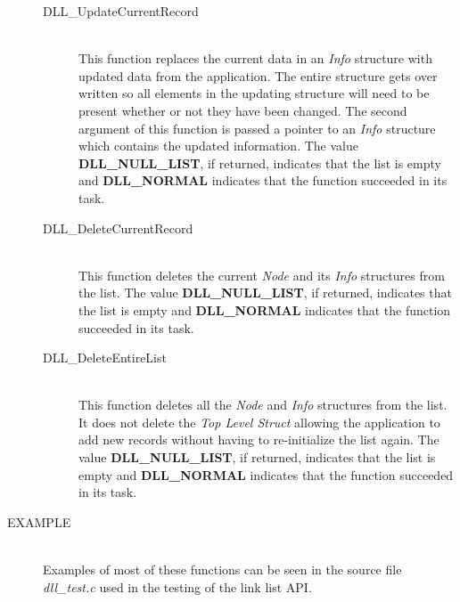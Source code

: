 \documentclass[10pt,letterpaper,titlepage]{article}
\begin{document}
\begin{description}
\begin{description}
 \item[DLL\_UpdateCurrentRecord]\quad\\
 This function replaces the current data in an \emph{Info} structure with updated data from the application.  The entire structure gets over written so all elements in the updating structure will need to be present whether or not they have been changed.  The second argument of this function is passed a pointer to an \emph{Info} structure which contains the updated information.  The value \textbf{DLL\_NULL\_LIST}, if returned, indicates that the list is empty and \textbf{DLL\_NORMAL} indicates that the function succeeded in its task.

 \item[DLL\_DeleteCurrentRecord]\quad\\
 This function deletes the current \emph{Node} and its \emph{Info} structures from the list.  The value \textbf{DLL\_NULL\_LIST}, if returned, indicates that the list is empty and \textbf{DLL\_NORMAL} indicates that the function succeeded in its task.

 \item[DLL\_DeleteEntireList]\quad\\
 This function deletes all the \emph{Node} and \emph{Info} structures from the list.  It does not delete the \emph{Top Level Struct} allowing the application to add new records without having to re-initialize the list again.  The value \textbf{DLL\_NULL\_LIST}, if returned, indicates that the list is empty and \textbf{DLL\_NORMAL} indicates that the function succeeded in its task.
 \end{description}

\item[EXAMPLE]\quad\\
Examples of most of these functions can be seen in the source file \emph{dll\_test.c} used in the testing of the link list API.

\end{description}
\pagebreak
\end{document}
